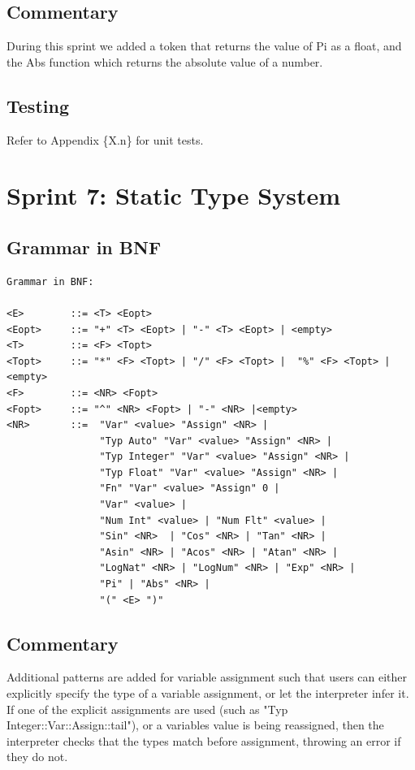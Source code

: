 \documentclass[a4paper, oneside, 11pt]{report}
\begin{document}
	\subsection{Commentary}
	During this sprint we added a token that returns the value of Pi as a float, and the Abs function which returns the absolute value of a number.


	\subsection{Testing}
	Refer to Appendix \{X.n\} for unit tests.

	\clearpage
	\section{Sprint 7: Static Type System}
	\subsection{Grammar in BNF}
	\begin{verbatim}
Grammar in BNF:

<E>        ::= <T> <Eopt>
<Eopt>     ::= "+" <T> <Eopt> | "-" <T> <Eopt> | <empty>
<T>        ::= <F> <Topt>
<Topt>     ::= "*" <F> <Topt> | "/" <F> <Topt> |  "%" <F> <Topt> |<empty>
<F>        ::= <NR> <Fopt>
<Fopt>     ::= "^" <NR> <Fopt> | "-" <NR> |<empty>
<NR>       ::=  "Var" <value> "Assign" <NR> |
                "Typ Auto" "Var" <value> "Assign" <NR> |
                "Typ Integer" "Var" <value> "Assign" <NR> |
                "Typ Float" "Var" <value> "Assign" <NR> |
                "Fn" "Var" <value> "Assign" 0 |
                "Var" <value> |
                "Num Int" <value> | "Num Flt" <value> |
                "Sin" <NR>  | "Cos" <NR> | "Tan" <NR> |
                "Asin" <NR> | "Acos" <NR> | "Atan" <NR> |
                "LogNat" <NR> | "LogNum" <NR> | "Exp" <NR> |
                "Pi" | "Abs" <NR> |
                "(" <E> ")"
	\end{verbatim}
	\subsection{Commentary}
	Additional patterns are added for variable assignment such that users can either explicitly specify the type of a variable assignment, or let the interpreter infer it. If one of the explicit assignments are used (such as "Typ Integer::Var::Assign::tail"), or a variables value is being reassigned, then the interpreter checks that the types match before assignment, throwing an error if they do not.
\end{document}
